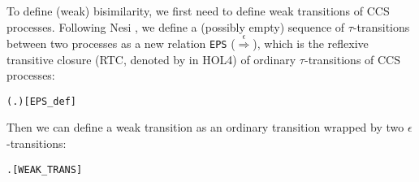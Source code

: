 To define (weak) bisimilarity, we first need to define weak
transitions of CCS processes. 
Following  Nesi \cite{Nesi:1992ve},
we define a (possibly empty) sequence of $\tau$-transitions between
two processes as
a new relation  \texttt{EPS}
($\overset{\epsilon}{\Rightarrow}$), which is the
reflexive transitive closure (RTC, denoted by \mbox{\color{blue}{$^*$}} in
HOL4) of ordinary $\tau$-transitions of CCS processes:
\begin{alltt}
 \HOLSymConst{\HOLTokenDefEquality{}} (\HOLTokenLambda{} .  \HOLTokenTransBegin\HOLSymConst{\ensuremath{\tau}}\HOLTokenTransEnd {})\HOLSymConst{\HOLTokenSupStar{}}\hfill{[EPS_def]}
\end{alltt}
Then we can define a weak transition as an ordinary transition wrapped by
two $\epsilon$-transitions:
\begin{alltt}
 \HOLTokenWeakTransBegin{}\HOLTokenWeakTransEnd {} \HOLSymConst{\HOLTokenDefEquality{}} \HOLSymConst{\HOLTokenExists{}} .  \HOLSymConst{\HOLTokenEPS}  \HOLSymConst{\HOLTokenConj{}}  \HOLTokenTransBegin{}\HOLTokenTransEnd {} \HOLSymConst{\HOLTokenConj{}}  \HOLSymConst{\HOLTokenEPS} \hfill{[WEAK_TRANS]}
\end{alltt}

